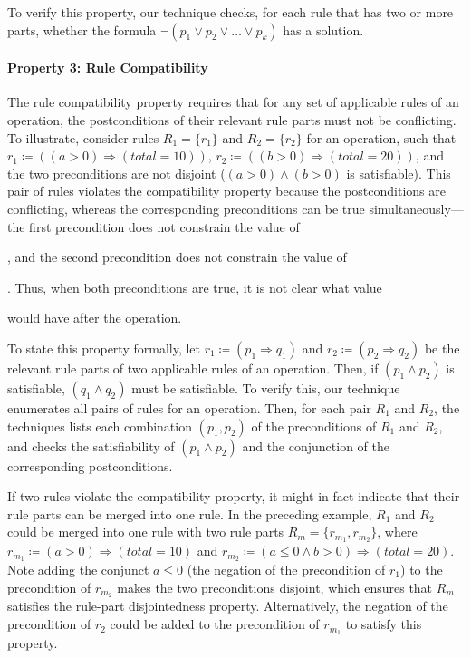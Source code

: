 To verify this property, our technique checks, for each rule that has two or
more parts, whether the formula $\neg(p_1 \vee p_2 \vee \ldots \vee p_k)$ has a
solution.

\paragraph*{Property 3: Rule Compatibility}
The rule compatibility property requires that for any set of applicable rules of
an operation, the postconditions of their relevant rule parts must not be
conflicting. To illustrate, consider rules $R_1 = \{r_1\}$ and $R_2 = \{r_2\}$
for an operation, such that $r_1 \coloneqq ((a > 0) \Longrightarrow (total =
10))$, $r_2 \coloneqq ((b > 0) \Longrightarrow (total = 20))$, and the two
preconditions are not disjoint (\ie $(a > 0) \wedge (b > 0)$ is
satisfiable). This pair of rules violates the compatibility property because the
postconditions are conflicting, whereas the corresponding preconditions can be
true simultaneously---the first precondition does not constrain the value of
\subject{b}, and the second precondition does not constrain the value of
\subject{a}. Thus, when both preconditions are true, it is not clear what value
\subject{total} would have after the operation.

To state this property formally, let $r_1 \coloneqq (p_1 \Longrightarrow q_1)$
and $r_2 \coloneqq (p_2 \Longrightarrow q_2)$ be the relevant rule parts of two
applicable rules of an operation. Then, if $(p_1 \wedge p_2)$ is satisfiable,
$(q_1 \wedge q_2)$ must be satisfiable. To verify this, our technique enumerates
all pairs of rules for an operation. Then, for each pair $R_1$ and $R_2$, the
techniques lists each combination $(p_1, p_2)$ of the preconditions of $R_1$ and
$R_2$, and checks the satisfiability of $(p_1 \wedge p_2)$ and the conjunction
of the corresponding postconditions.

If two rules violate the compatibility property, it might in fact indicate that
their rule parts can be merged into one rule. In the preceding example, $R_1$
and $R_2$ could be merged into one rule with two rule parts $R_m = \{r_{m_1},
r_{m_2}\}$, where $r_{m_1} \coloneqq (a > 0) \Longrightarrow (total = 10)$ and
$r_{m_2} \coloneqq (a \leq 0 \wedge b > 0) \Longrightarrow (total = 20)$. Note
adding the conjunct $a \leq 0$ (the negation of the precondition of $r_1$) to
the precondition of $r_{m_2}$ makes the two preconditions disjoint, which
ensures that $R_m$ satisfies the rule-part disjointedness
property. Alternatively, the negation of the precondition of $r_2$ could be
added to the precondition of $r_{m_1}$ to satisfy this property.

